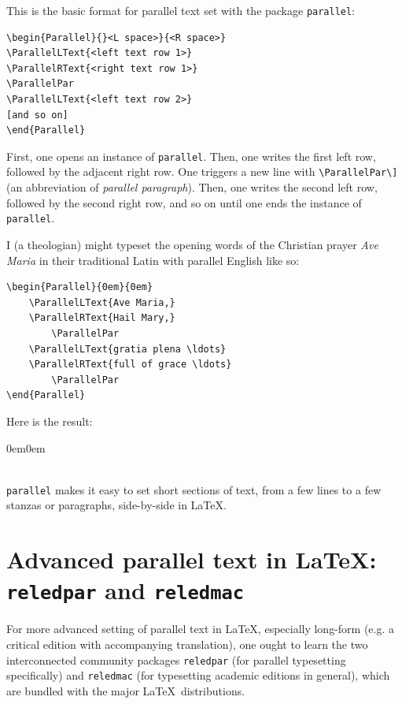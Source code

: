 \documentclass{ltugboat}
\begin{document}
This is the basic format for parallel text set with the package \texttt{parallel}:

\begin{verbatim}
\begin{Parallel}{}<L space>}{<R space>}
\ParallelLText{<left text row 1>}
\ParallelRText{<right text row 1>}
\ParallelPar
\ParallelLText{<left text row 2>}
[and so on]
\end{Parallel}	
\end{verbatim}
First, one opens an instance of \texttt{parallel}. Then, one writes the first left row, followed by the adjacent right row. One triggers a new line with \verb|\ParallelPar\]| (an abbreviation of \textit{parallel paragraph}). Then, one writes the second left row, followed by the second right row, and so on until one ends the instance of \texttt{parallel}.

I (a theologian) might typeset the opening words of the Christian prayer \textit{Ave Maria} in their traditional Latin with parallel English like so:

\begin{verbatim}
\begin{Parallel}{0em}{0em}
	\ParallelLText{Ave Maria,}
	\ParallelRText{Hail Mary,}
		\ParallelPar
	\ParallelLText{gratia plena \ldots}
	\ParallelRText{full of grace \ldots}
		\ParallelPar
\end{Parallel}	
\end{verbatim}

Here is the result:

\medskip
\begin{minipage}{.4\textwidth}
\begin{Parallel}{0em}{0em}
\ParallelPar
{}
\ParallelPar
\end{Parallel}
\end{minipage}\\

\texttt{parallel} makes it easy to set short sections of text, from a few lines to a few stanzas or paragraphs, side-by-side in \LaTeX.

\section{Advanced parallel text in \LaTeX:\\ \texttt{reledpar} and \texttt{reledmac}}

For more advanced setting of parallel text in \LaTeX, especially long-form (e.g. a critical edition with accompanying translation), one ought to learn the two interconnected community packages \texttt{reledpar} (for parallel typesetting specifically) and \texttt{reledmac} (for typesetting academic editions in general), which are bundled with the major \LaTeX\ distributions.
\end{document}
